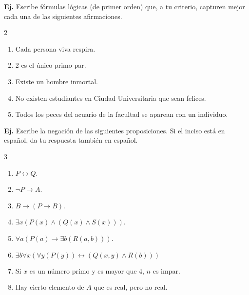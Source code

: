 \documentclass[letterpaper,DIV=14,headsepline,12pt]{scrartcl}
\newcounter{Ejer}
\newcommand{\pts}{}
\newenvironment{ejercicio}[1]{\noindent
    \ifthenelse{\equal{#1}{1}}{\renewcommand{\pts}{\textbf{(#1 pt)}}}{\renewcommand{\pts}{\textbf{(#1 pts)}}}\textbf{Ej. \theEjer} \pts\stepcounter{Ejer}}{\vspace{.3cm}}
\begin{document}
    \begin{ejercicio}{1}
        Escribe fórmulas lógicas (de primer orden) que, a tu criterio, capturen mejor cada una de las siguientes afirmaciones.
        \begin{paracol}{2}
            \begin{enumerate}
                \item Cada persona viva respira.
                \item $2$ es el único primo par.
                \item Existe un hombre inmortal.
            \end{enumerate}
            \switchcolumn
             \begin{enumerate}\setcounter{enumi}{3}
                \item No existen estudiantes en Ciudad Universitaria que sean felices.
                \item Todos los peces del acuario de la facultad se aparean con un individuo.
            \end{enumerate}
        \end{paracol}
    \end{ejercicio}

    \begin{ejercicio}{1}
        Escribe la negación de las siguientes proposiciones. Si el inciso está en español, da tu respuesta también en español.
        \begin{paracol}{3}
            \begin{enumerate}
                \item $P \leftrightarrow Q$.
                \item $\lnot P \to A$.
                \item $B \to (P \to B)$.
            \end{enumerate}

            \switchcolumn
             \begin{enumerate}\setcounter{enumi}{3}
                \item $\exists x (P(x) \land (Q(x) \land S(x)))$.
                \item $\forall a (P(a) \to \exists b (R(a,b)))$.
                \item $\exists b \forall x (\forall y(P(y)) \leftrightarrow (Q(x,y) \land R(b)))$
            \end{enumerate}

            \switchcolumn
             \begin{enumerate}\setcounter{enumi}{6}
                \item Si $x$ es un número primo y es mayor que 4, $n$ es impar.
                \item Hay cierto elemento de $A$ que es real, pero no real.
            \end{enumerate}
        \end{paracol}
    \end{ejercicio}
\end{document}
